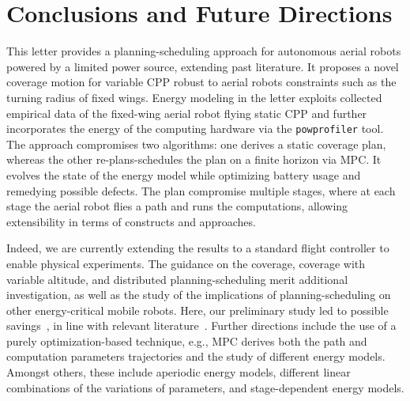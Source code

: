 \documentclass[letterpaper,10pt,journal,twoside]{IEEEtran}
\newcommand{\stt}[1]{{\small\tt #1}} %
\newcommand{\powprof}{\stt{powprofiler}}
\theoremstyle{definition}
\begin{document}
\vspace*{-1.5ex}
\section{Conclusions and Future Directions}  %
\label{sec:conclusion}                       %
This letter provides a planning-scheduling approach for autonomous aerial robots powered by a limited power source, extending past literature. It proposes a novel coverage motion for variable CPP robust to aerial robots constraints such as the turning radius of fixed wings. Energy modeling in the letter exploits collected empirical data of the fixed-wing aerial robot flying static CPP and further incorporates the energy of the computing hardware via the \powprof{} tool. The approach compromises two algorithms: one derives a static coverage plan, whereas the other re-plans-schedules the plan on a finite horizon via MPC. It evolves the state of the energy model while optimizing battery usage and remedying possible defects. The plan compromise multiple stages, where at each stage the aerial robot flies a path and runs the computations, allowing %
extensibility in terms of constructs and approaches.

Indeed, we are currently extending the results to a standard flight controller to enable physical experiments. The guidance on the coverage, coverage with variable altitude, %
and distributed planning-scheduling merit additional investigation, as well as the study of the implications of planning-scheduling on other energy-critical mobile robots. Here, our preliminary study led to possible savings~\cite{seewald2020beyond}, in line with relevant literature~\cite{ondruska2015scheduled,lahijanian2018resource}.
Further directions include {\color{blue}the use of a purely optimization-based technique, e.g., MPC derives both the path and computation parameters trajectories and} the study of different energy models. Amongst others, these include aperiodic energy models, different linear combinations of the variations of parameters, and stage-dependent energy models.%


{\small  %
}             %
%  
                                    
\end{document}
